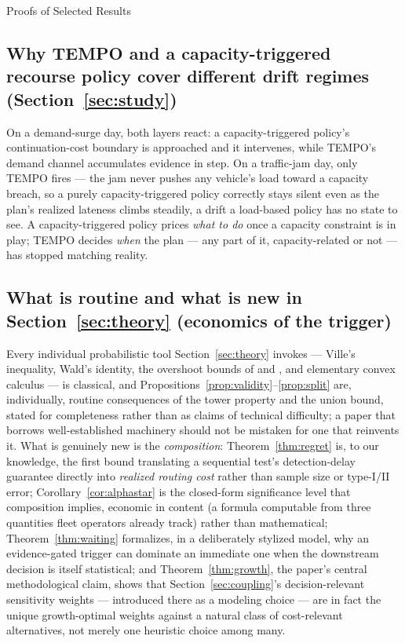\documentclass[trsc,dblanonrev]{informs4}
\begin{document}
\begin{APPENDIX}{Proofs of Selected Results}
\subsection{Why TEMPO and a capacity-triggered recourse policy cover different drift regimes (Section~\ref{sec:study})}

On a demand-surge day, both layers react: a capacity-triggered
policy's continuation-cost boundary is approached and it intervenes,
while TEMPO's demand channel accumulates evidence in step. On a
traffic-jam day, only TEMPO fires --- the jam never pushes any
vehicle's load toward a capacity breach, so a purely capacity-triggered
policy correctly stays silent even as the plan's realized lateness
climbs steadily, a drift a load-based policy has no state to see. A
capacity-triggered policy prices \emph{what to do} once a capacity
constraint is in play; TEMPO decides \emph{when} the plan --- any part
of it, capacity-related or not --- has stopped matching reality.

\subsection{What is routine and what is new in Section~\ref{sec:theory} (economics of the trigger)}

Every individual probabilistic tool Section~\ref{sec:theory} invokes
--- Ville's inequality, Wald's identity, the overshoot bounds of
\citet{lorden1970excess} and \citet{woodroofe1982nonlinear}, and
elementary convex calculus --- is classical, and
Propositions~\ref{prop:validity}--\ref{prop:split} are, individually,
routine consequences of the tower property and the union bound, stated
for completeness rather than as claims of technical difficulty; a
paper that borrows well-established machinery should not be mistaken
for one that reinvents it. What is genuinely new is the
\emph{composition}: Theorem~\ref{thm:regret} is, to our knowledge, the
first bound translating a sequential test's detection-delay guarantee
directly into \emph{realized routing cost} rather than sample size or
type-I/II error; Corollary~\ref{cor:alphastar} is the closed-form
significance level that composition implies, economic in content (a
formula computable from three quantities fleet operators already
track) rather than mathematical; Theorem~\ref{thm:waiting} formalizes,
in a deliberately stylized model, why an evidence-gated trigger can
dominate an immediate one when the downstream decision is itself
statistical; and Theorem~\ref{thm:growth}, the paper's central
methodological claim, shows that Section~\ref{sec:coupling}'s
decision-relevant sensitivity weights --- introduced there as a
modeling choice --- are in fact the unique growth-optimal weights
against a natural class of cost-relevant alternatives, not merely one
heuristic choice among many.


\end{APPENDIX}
\end{document}

